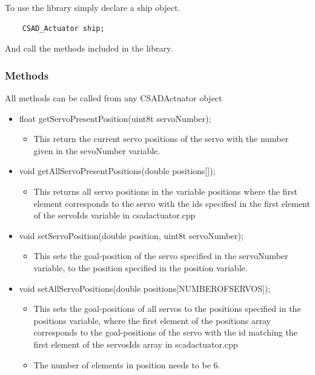 \noindent To use the library simply declare a ship object.

\begin{verbatim}
    CSAD_Actuator ship;
\end{verbatim}
And call the methods included in the library.


\newpage
\subsubsection{Methods}
All methods can be called from any CSAD\textunderscore Actuator object
\begin{itemize}
  \item float getServoPresentPosition(uint8\textunderscore t servoNumber);
  \begin{itemize}
    \item This return the current servo positions of the servo with the number given in the sevoNumber variable.
  \end{itemize}
  \item void getAllServoPresentPositions(double positions[]);  
  \begin{itemize}
    \item This returns all servo positions in the variable positions where the first element corresponds to the servo with the ids specified in the first element of the servoIds variable in csad\textunderscore actuator.cpp
  \end{itemize}
  \item void setServoPosition(double position, uint8\textunderscore t servoNumber);  
  \begin{itemize}
    \item This sets the goal-position of the servo specified in the servoNumber variable, to the position specified in the position variable.
  \end{itemize}
  \item void setAllServoPositions(double positions[NUMBER\textunderscore OF\textunderscore SERVOS]);  
  \begin{itemize}
    \item This sets the goal-positions of all servos to the positions specified in the positions variable, where the first element of the positions array corresponds to the goal-positions of the servo with the id matching the first element of the servosIds array in scad\textunderscore actuator.cpp
    \item The number of elements in position needs to be 6.
  \end{itemize}

\end{itemize}
